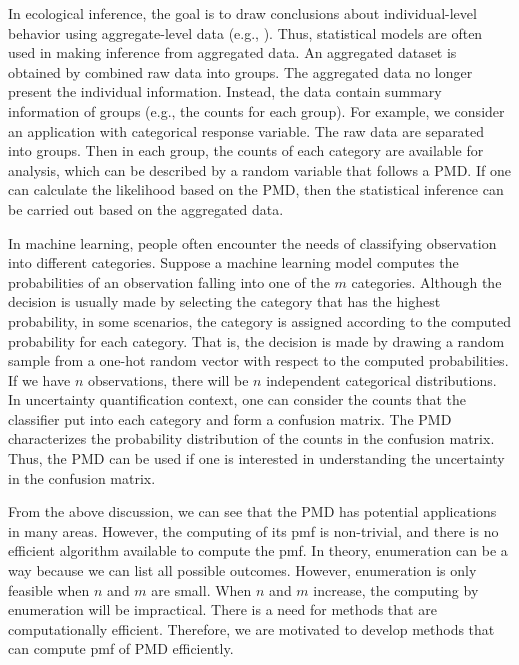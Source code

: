 \documentclass[12pt]{article}
\newcommand{\PMD}{\textrm{PMD}}
\begin{document}
In ecological inference, the goal is to draw conclusions about individual-level behavior using aggregate-level data (e.g., ). Thus, statistical models are often used in making inference from aggregated data. An aggregated dataset is obtained by combined raw data into groups. The aggregated data no longer present the individual information. Instead, the data contain summary information of groups (e.g., the counts for each group). For example, we consider an application with categorical response variable. The raw data are separated into groups. Then in each group, the counts of each category are available for analysis, which can be described by a random variable that follows a $\PMD$. If one can calculate the likelihood based on the $\PMD$, then the statistical inference can be carried out based on the aggregated data.

In machine learning, people often encounter the needs of classifying observation into different categories. Suppose a machine learning model computes the probabilities of an observation falling into one of the $m$ categories. Although the decision is usually made by selecting the category that has the highest probability, in some scenarios, the category is assigned according to the computed probability for each category. That is, the decision is made by drawing a random sample from a one-hot random vector with respect to the computed probabilities. If we have $n$ observations, there will be $n$ independent categorical distributions. In uncertainty quantification context, one can consider the counts that the classifier put into each category and form a confusion matrix. The $\PMD$ characterizes the probability distribution of the counts in the confusion matrix. Thus, the PMD can be used if one is interested in understanding the uncertainty in the confusion matrix. 

From the above discussion, we can see that the $\PMD$ has potential applications in many areas. However, the computing of its pmf is non-trivial, and there is no efficient algorithm available to compute the pmf. In theory, enumeration can be a way because we can list all possible outcomes.  However, enumeration is only feasible when $n$ and $m$ are small. When $n$ and $m$ increase, the computing by enumeration will be impractical. There is a need for methods that are computationally efficient.  Therefore, we are motivated to develop methods that can compute pmf of $\PMD$ efficiently.


\end{document}
